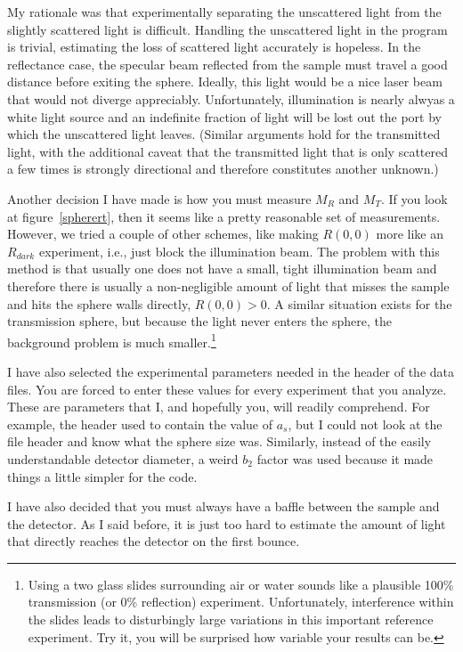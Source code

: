 \documentclass{article}
\begin{document}
My rationale was that experimentally separating the unscattered light
from the slightly scattered light is difficult.  Handling the unscattered
light in the program is trivial, estimating the loss of scattered light
accurately is hopeless.  In the reflectance case, the specular beam
reflected from the sample must travel a good distance before exiting the
sphere.  Ideally, this light would be a nice laser beam that would not
diverge appreciably.  Unfortunately, illumination is nearly alwyas
a white light source and an indefinite fraction of light will be lost out
the port by which the unscattered light leaves.
(Similar arguments hold for the transmitted light, with the additional
caveat that the transmitted light that is only scattered a few times
is strongly directional and therefore constitutes another unknown.)

Another decision I have made is how you must measure $M_R$ and $M_T$.  If
you look at figure~\ref{spherert}, then it seems like a pretty reasonable
set of measurements.  However, we tried a couple of other schemes, like 
making $R(0,0)$ more like an $R_\mathit{dark}$ experiment, i.e., just block
the illumination beam.  The problem with this method is that usually
one does not have a small, tight illumination beam and therefore there is
usually a non-negligible amount of light that misses the sample and hits
the sphere walls directly, $R(0,0) > 0$.  A similar situation exists for
the transmission sphere, but because the light never enters the sphere,
the background problem is much smaller.\footnote{Using a two
glass slides surrounding air or water sounds like a plausible 100\%
transmission (or 0\% reflection) experiment.  Unfortunately, interference within the slides
leads to disturbingly large variations in this important reference
experiment. Try it, you will be surprised how variable your results
can be.}

I have also selected the experimental parameters needed in the header of the 
data files.  You are forced to enter these values for every experiment that
you analyze.  These are parameters that I, and hopefully you, will readily
comprehend.  For example, the header
used to contain the value of $a_s$, but I could not look at the file header and
know what the sphere size was.  Similarly, instead of the easily understandable
detector diameter, a weird $b_2$ factor was used because it made things a little 
simpler for the code. 

I have also decided that you must always have a baffle between the sample
and the detector.  As I said before, it is just too hard to estimate the
amount of light that directly reaches the detector on the first bounce.  
\end{document}
